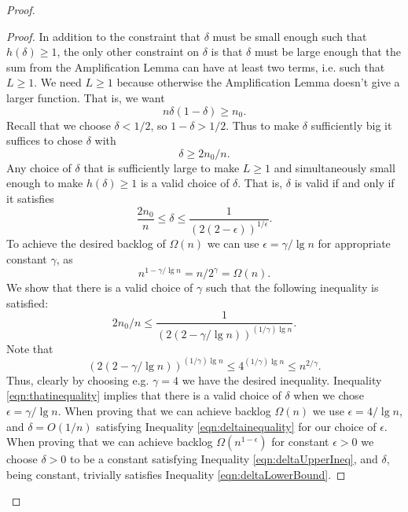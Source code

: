 \documentclass[twocolumn]{article}[10pt]
\begin{document}
\begin{proof}
\begin{proof}
  In addition to the constraint that $\delta$ must be small enough such that
  $h(\delta) \ge 1$, the only other constraint on $\delta$ is that $\delta$
  must be large enough that the sum from the Amplification Lemma can have at least
  two terms, i.e. such that $L \ge 1$. We need $L\ge 1$ because otherwise the
  Amplification Lemma doesn't give a larger function.
  That is, we want
  $$n\delta(1-\delta) \ge n_0. $$
  Recall that we choose $\delta < 1/2$, so $1-\delta > 1/2$. Thus to make
  $\delta$ sufficiently big it suffices to chose $\delta$ with 
  \begin{equation}
    \label{eqn:deltaLowerBound}
    \delta \ge 2n_0/n.
  \end{equation}
  Any choice of $\delta$ that is sufficiently large to make $L \ge 1$ and
  simultaneously small enough to make $h(\delta) \ge 1$ is a valid choice of
  $\delta$. That is, $\delta$ is valid if and only if it satisfies
  \begin{equation}
    \label{eqn:deltainequality}
    \frac{2n_0}{n} \le \delta \le  \frac{1}{(2(2-\epsilon))^{1/\epsilon}}.
  \end{equation}
  To achieve the desired backlog of $\Omega(n)$ we can use $\epsilon =
  \gamma/\lg n$ for appropriate constant $\gamma$, as $$n^{1-\gamma/\lg n} =
  n/2^\gamma = \Omega(n).$$
  We show that there is a valid choice of $\gamma$ such that the following inequality is satisfied:
  \begin{equation}
    \label{eqn:thatinequality}
   2n_0/n \le \frac{1}{(2(2-\gamma/\lg n))^{(1/\gamma)\lg n}}.
  \end{equation}
  Note that 
  $$(2(2-\gamma/\lg n))^{(1/\gamma)\lg n} \le 4^{(1/\gamma)\lg n} \le n^{2/\gamma}.$$
  Thus, clearly by choosing e.g. $\gamma = 4$ we have the desired inequality.
  Inequality \ref{eqn:thatinequality} implies that there is a valid choice of
  $\delta$ when we chose $\epsilon = \gamma / \lg n$. When proving that we can
  achieve backlog $\Omega(n)$ we use $\epsilon = 4 / \lg n$, and $\delta =
  O(1/n)$ satisfying Inequality \ref{eqn:deltainequality} for our choice
  of $\epsilon$. When proving that we can achieve backlog
  $\Omega(n^{1-\epsilon})$ for constant $\epsilon > 0$ we choose $\delta > 0$ to be
  a constant satisfying Inequality \ref{eqn:deltaUpperIneq}, and $\delta$,
  being constant, trivially satisfies Inequality \ref{eqn:deltaLowerBound}.
    
  \end{proof}


\end{proof}
\end{document}
